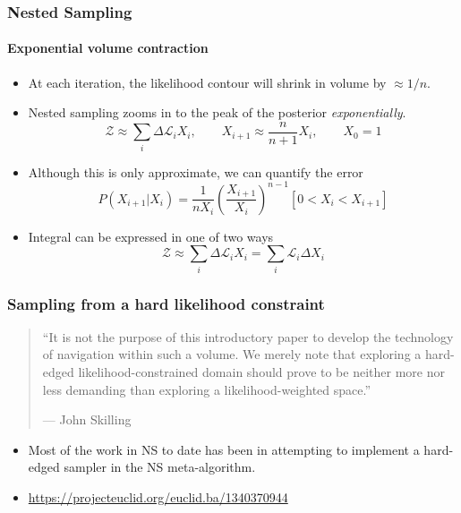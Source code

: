 \documentclass[%
]{beamer}
\newcommand{\lik}{\mathcal{L}}
\newcommand{\ev}{\mathcal{Z}}
\begin{document}

\begin{frame}
  \frametitle{Nested Sampling} 
  \framesubtitle{Exponential volume contraction} 
  
  \begin{itemize}
    \item At each iteration, the likelihood contour will shrink in volume by  $\approx 1/n$.
    \item Nested sampling zooms in to the peak of the posterior {\em exponentially}.
      \begin{equation}
          \ev \approx \sum_i \Delta\lik_i X_{i}, \qquad
        X_{i+1} \approx \frac{n}{n+1}X_i, \qquad X_{0} = 1 \nonumber
      \end{equation}
    \item Although this is only approximate, we can quantify the error \\
      \begin{equation}
          P(X_{i+1}|X_i) = \frac{1}{n X_i}{\left( \frac{X_{i+1}}{X_i} \right)}^{n-1}[0<X_i<X_{i+1}]
          \nonumber
      \end{equation}
    \item Integral can be expressed in one of two ways
      \begin{equation}
          \ev \approx \sum_i \Delta\lik_i X_{i} = \sum_i \lik_i \Delta X_{i} \nonumber
      \end{equation}

  \end{itemize}
  
\end{frame}



\begin{frame}
  \frametitle{Sampling from a hard likelihood constraint} 

  
  \begin{quote}
    ``It is not the purpose of this introductory paper to develop the technology of navigation within such a volume. We merely note that exploring a hard-edged likelihood-constrained domain should prove to be neither more nor less demanding than exploring a likelihood-weighted space.''
    
   {\hfill --- John Skilling}
  \end{quote}

  \begin{itemize}
      
    \item Most of the work in NS to date has been in attempting to implement a hard-edged sampler in the NS meta-algorithm.
    \item \url{https://projecteuclid.org/euclid.ba/1340370944}
  \end{itemize}
 
\end{frame}
\end{document}
